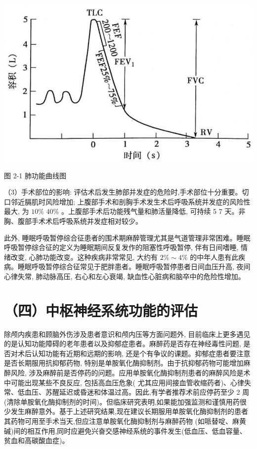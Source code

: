 \documentclass[10pt]{article}
\begin{document}
\begin{center}
\includegraphics[max width=\textwidth]{2024_07_09_002a177993bd97d1d6d7g-038}
\end{center}

图 2-1 肺功能曲线图

（3）手术部位的影响: 评估术后发生肺部并发症的危险时,手术部位十分重要。切口邻近膈肌时风险增加; 上腹部手术和剖胸手术发生术后呼吸系统并发症的风险性最大, 为 $10 \%$ $40 \%$ 。上腹部手术后功能残气量和肺活量降低, 可持续 5 7 天。非胸、腹部手术术后呼吸系统并发症相对较少。

此外, 睡眠呼吸暂停综合征患者的围术期麻醉管理尤其是气道管理非常困难。睡眠呼吸暂停综合征的定义为睡眠期间反复发作的阻塞性呼吸暂停, 伴有日间嗜睡, 情绪改变, 心肺功能改变。这种疾病非常常见, 大约有 $2 \% \sim 4 \%$ 的中年人患有此疾病。睡眠呼吸暂停综合征常见于肥胖患者。睡眠呼吸暂停患者日间血压升高, 夜间心律失常, 肺动脉高压, 右心和左心衰竭, 缺血性心脏病和脑卒中的危险性增加。

\section*{（四）中枢神经系统功能的评估}
除颅内疾患和顾脑外伤涉及患者意识和颅内压等方面问题外, 目前临床上更多遇见的是认知功能障碍的老年患者以及抑郁症患者。麻醉药是否存在神经毒性问题, 是否对术后认知功能有近期和远期的影响, 还是个有争议的课题。抑郁症患者要注意是否长期服用抗抑郁药物, 特别是单胺氧化酶抑制剂。由于抗抑郁药物可能增加麻醉风险, 涉及麻醉前是否停药的问题。应用单胺氧化酶抑制剂患者的麻醉风险是术中可能出现某些不良反应, 包括高血压危象( 尤其应用间接血管收缩药者)、心律失常、低血压、苏醒延迟或昏迷和体温过高。因此,有学者推荐术前应停药至少 2 周 (清除单胺氧化酶抑制剂的时间)。但临床研究表明,如果能加强监测和谨慎用药很少发生麻醉意外。基于上述研究结果,现在建议长期服用单胺氧化酶抑制剂的患者其药物可用至手术当天,但应注意单胺氧化酶抑制剂与麻醉药物 (如哌替啶、麻黄碱)间的相互作用,同时应避免兴奋交感神经系统的事件发生(低血压、低血容量、贫血和高碳酸血症)。
\end{document}
